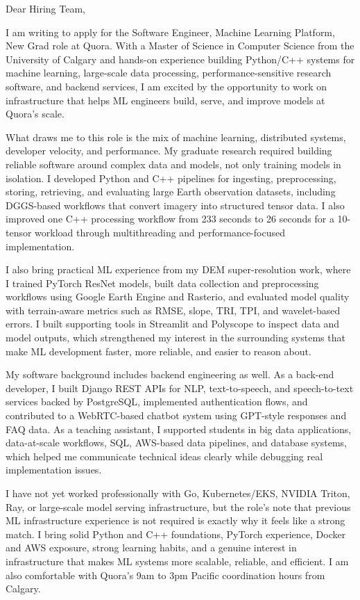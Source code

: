 \documentclass[11pt]{letter}
\begin{document}
\begin{letter}{}

\opening{Dear Hiring Team,}

I am writing to apply for the Software Engineer, Machine Learning Platform, New Grad role at Quora. With a Master of Science in Computer Science from the University of Calgary and hands-on experience building Python/C++ systems for machine learning, large-scale data processing, performance-sensitive research software, and backend services, I am excited by the opportunity to work on infrastructure that helps ML engineers build, serve, and improve models at Quora's scale.

What draws me to this role is the mix of machine learning, distributed systems, developer velocity, and performance. My graduate research required building reliable software around complex data and models, not only training models in isolation. I developed Python and C++ pipelines for ingesting, preprocessing, storing, retrieving, and evaluating large Earth observation datasets, including DGGS-based workflows that convert imagery into structured tensor data. I also improved one C++ processing workflow from 233 seconds to 26 seconds for a 10-tensor workload through multithreading and performance-focused implementation.

I also bring practical ML experience from my DEM super-resolution work, where I trained PyTorch ResNet models, built data collection and preprocessing workflows using Google Earth Engine and Rasterio, and evaluated model quality with terrain-aware metrics such as RMSE, slope, TRI, TPI, and wavelet-based errors. I built supporting tools in Streamlit and Polyscope to inspect data and model outputs, which strengthened my interest in the surrounding systems that make ML development faster, more reliable, and easier to reason about.

My software background includes backend engineering as well. As a back-end developer, I built Django REST APIs for NLP, text-to-speech, and speech-to-text services backed by PostgreSQL, implemented authentication flows, and contributed to a WebRTC-based chatbot system using GPT-style responses and FAQ data. As a teaching assistant, I supported students in big data applications, data-at-scale workflows, SQL, AWS-based data pipelines, and database systems, which helped me communicate technical ideas clearly while debugging real implementation issues.

I have not yet worked professionally with Go, Kubernetes/EKS, NVIDIA Triton, Ray, or large-scale model serving infrastructure, but the role's note that previous ML infrastructure experience is not required is exactly why it feels like a strong match. I bring solid Python and C++ foundations, PyTorch experience, Docker and AWS exposure, strong learning habits, and a genuine interest in infrastructure that makes ML systems more scalable, reliable, and efficient. I am also comfortable with Quora's 9am to 3pm Pacific coordination hours from Calgary.


\end{letter}
\end{document}
